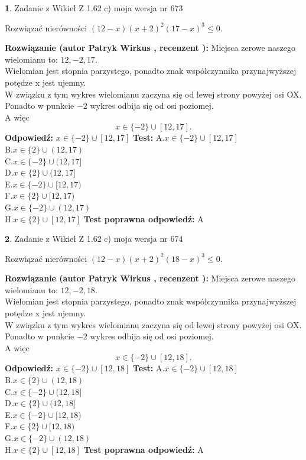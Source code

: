 \documentclass[12pt, a4paper]{article}
\theoremstyle{definition} %
\newtheorem{zad}{}
\newcommand{\zadStart}[1]{\begin{zad}#1\newline}
\newcommand{\zadStop}{\end{zad}}
\newcommand{\rozwStart}[2]{\noindent \textbf{Rozwiązanie (autor #1 , recenzent #2): }\newline}
\newcommand{\rozwStop}{\newline}
\newcommand{\odpStart}{\noindent \textbf{Odpowiedź:}\newline}
\newcommand{\odpStop}{\newline}
\newcommand{\testStart}{\noindent \textbf{Test:}\newline}
\newcommand{\testStop}{\newline}
\newcommand{\kluczStart}{\noindent \textbf{Test poprawna odpowiedź:}\newline}
\newcommand{\kluczStop}{\newline}
\begin{document}
\zadStart{Zadanie z Wikieł Z 1.62 c) moja wersja nr 673}

Rozwiązać nierówności $(12-x)(x+2)^{2}(17-x)^{3}\le0$.
\zadStop
\rozwStart{Patryk Wirkus}{}
Miejsca zerowe naszego wielomianu to: $12, -2, 17$.\\
Wielomian jest stopnia parzystego, ponadto znak współczynnika przy\linebreak najwyższej potędze x jest ujemny.\\ W związku z tym wykres wielomianu zaczyna się od lewej strony powyżej osi OX.\\
Ponadto w punkcie $-2$ wykres odbija się od osi poziomej.\\
A więc $$x \in \{-2\} \cup [12,17].$$
\rozwStop
\odpStart
$x \in \{-2\} \cup [12,17]$
\odpStop
\testStart
A.$x \in \{-2\} \cup [12,17]$\\
B.$x \in \{2\} \cup (12,17)$\\
C.$x \in \{-2\} \cup (12,17]$\\
D.$x \in \{2\} \cup (12,17]$\\
E.$x \in \{-2\} \cup [12,17)$\\
F.$x \in \{2\} \cup [12,17)$\\
G.$x \in \{-2\} \cup (12,17)$\\
H.$x \in \{2\} \cup [12,17]$
\testStop
\kluczStart
A
\kluczStop



\zadStart{Zadanie z Wikieł Z 1.62 c) moja wersja nr 674}

Rozwiązać nierówności $(12-x)(x+2)^{2}(18-x)^{3}\le0$.
\zadStop
\rozwStart{Patryk Wirkus}{}
Miejsca zerowe naszego wielomianu to: $12, -2, 18$.\\
Wielomian jest stopnia parzystego, ponadto znak współczynnika przy\linebreak najwyższej potędze x jest ujemny.\\ W związku z tym wykres wielomianu zaczyna się od lewej strony powyżej osi OX.\\
Ponadto w punkcie $-2$ wykres odbija się od osi poziomej.\\
A więc $$x \in \{-2\} \cup [12,18].$$
\rozwStop
\odpStart
$x \in \{-2\} \cup [12,18]$
\odpStop
\testStart
A.$x \in \{-2\} \cup [12,18]$\\
B.$x \in \{2\} \cup (12,18)$\\
C.$x \in \{-2\} \cup (12,18]$\\
D.$x \in \{2\} \cup (12,18]$\\
E.$x \in \{-2\} \cup [12,18)$\\
F.$x \in \{2\} \cup [12,18)$\\
G.$x \in \{-2\} \cup (12,18)$\\
H.$x \in \{2\} \cup [12,18]$
\testStop
\kluczStart
A
\kluczStop
\end{document}

